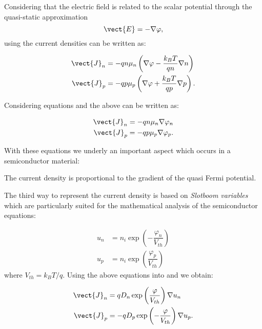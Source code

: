 Considering that the electric field is related to the scalar potential through the quasi-static approximation
\begin{equation}
\label{eq: relazione pot electric}
\vect{E}  = -\nabla \varphi ,
\end{equation}
using  the current densities can be written as:

\begin{align}
\vect{J}_n &= -qn\mu_n\left(\nabla \varphi - \dfrac{k_BT}{qn}\nabla n \right) \label{eq: Jn DD} \\ 
\vect{J}_p &= -qp\mu_p\left(\nabla \varphi+ \dfrac{k_BT}{qp} \nabla p \right). \label{eq: Jp DD}
\end{align}

Considering equations  and  the above can be written as:

\begin{align}
\vect{J}_n = -qn\mu_n\nabla \varphi_n \label{eq: Jn qf}\\
\vect{J}_p = -qp\mu_p\nabla \varphi_p \label{eq: Jp qf}.
\end{align}

With these equations we underly an important aspect which occurs in a semiconductor material:
\begin{Osservazione}
The current density is proportional to the gradient of the quasi Fermi potential.
\end{Osservazione}

The third way to represent the current density is based on \textit{Slotboom variables} which are particularly suited for the mathematical analysis of the semiconductor equations:

\begin{align}
u_n &= n_i\exp\left(-\dfrac{\varphi_n}{V_{th}} \right) \label{eq: un slotboom} \\
u_p &= n_i\exp\left(\dfrac{\varphi_p}{V_{th}} \right) \label{eq: up slotboom} 
\end{align}
where $V_{th}=k_BT/q$. Using the above equations into  and  we obtain:

\begin{align}
\vect{J}_n &= qD_n \exp\left(\dfrac{\varphi}{V_{th}}\right) \nabla u_n \label{eq: Jn slotboom} \\
\vect{J}_p &= -qD_p \exp\left(-\dfrac{\varphi}{V_{th}}\right)  \nabla u_p .\label{eq: Jp slotboom}
\end{align}

